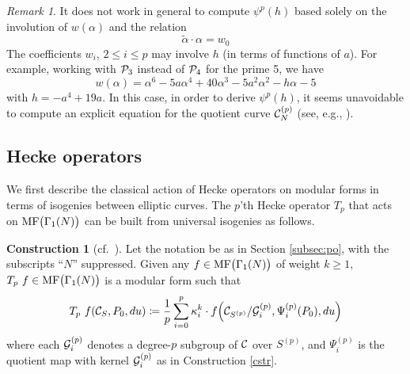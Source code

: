 \documentclass{gtpart}
\theoremstyle{definition}
\newtheorem{cstr}[equation]{Construction}
\theoremstyle{remark}
\newtheorem{rmk}[equation]{Remark}
\newcommand{\CC}{{\cal C}}
\newcommand{\CG}{{\cal G}}
\newcommand{\CP}{{\cal P}}
\newcommand{\MF}{{\rm MF}}
\newcommand{\A}{\alpha}
\newcommand{\G}{\Gamma}
\newcommand{\K}{\kappa}
\newcommand{\ce}{\coloneqq}
\renewcommand{\=}{\approx}
\renewcommand{\-}{\sim}
\numberwithin{equation}{section}
\begin{document}
\begin{rmk}
 \label{rmk:invl}
 It does not work in general to compute $\psi^p(h)$ based solely on the 
 involution of $w(\A)$ and the relation 
 \begin{equation}
  \label{w0}
  \widetilde{\A} \cdot \A = w_0 
 \end{equation}
 The coefficients $w_i$, $2 \leq i \leq p$ may involve $h$ (in terms of 
 functions of $a$).  For example, working with $\CP_3$ instead of $\CP_4$ for 
 the prime 5, we have 
 \[
  w(\A) = \A^6 - 5 a \A^4 + 40 \A^3 - 5 a^2 \A^2 - h \A - 5 
 \]
 with $h = -a^4 + 19 a$.  In this case, in order to derive $\psi^p(h)$, it seems 
 unavoidable to compute an explicit equation for the quotient curve 
 $\CC_N^{(p)}$ (see, e.g., \cite[proof of Proposition 2.3]{p3}).  
\end{rmk}



\subsection{Hecke operators}
\label{subsec:ho}

We first describe the classical action of Hecke operators on modular forms in 
terms of isogenies between elliptic curves.  The $p$'th Hecke operator $T_p$ 
that acts on $\MF\big(\G_1(N)\big)$ can be built from universal isogenies as 
follows.  

\begin{cstr}[{cf.~\cite[(1.11.0.2)]{padicprop}}]
 Let the notation be as in Section \ref{subsec:po}, with the subscripts ``$N$'' 
 suppressed.  Given any $f \in \MF\big(\G_1(N)\big)$ of weight $k \geq 1$, 
 $T_p~f \in \MF\big(\G_1(N)\big)$ is a modular form such that 
 \begin{equation}
  \label{Tp}
  T_p~f(\CC_S, P_0, du) \ce \frac{1}{p} \sum_{i = 0}^p \K_i^k \cdot 
  f\!\left(\CC_{S^{(p)}}/\CG^{(p)}_i, \Psi^{(p)}_i(P_0), du\right) 
 \end{equation}
 where each $\CG^{(p)}_i$ denotes a degree-$p$ subgroup of $\CC$ over $S^{(p)}$, 
 and $\Psi^{(p)}_i$ is the quotient map with kernel $\CG^{(p)}_i$ as in 
 Construction \ref{cstr}.  
\end{cstr}
\end{document}

